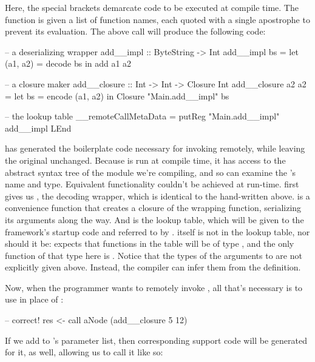 \documentclass[preprint]{sigplanconf}
\begin{document}
Here, the special brackets \textt{\$( )} demarcate code to be executed at compile time. The  function is given a list of function names, each quoted with a single apostrophe to prevent its evaluation. The above  call will produce the following code:

\begin{code}
-- a deserializing wrapper
add__impl :: ByteString -> Int
add__impl bs =
  let (a1, a2) = decode bs
   in add a1 a2

-- a closure maker
add__closure :: Int -> Int -> Closure Int
add__closure a2 a2 = 
  let bs = encode (a1, a2)
   in Closure "Main.add__impl" bs

-- the lookup table
__remoteCallMetaData = 
  putReg "Main.add__impl" add__impl LEnd
\end{code}

 has generated the boilerplate code necessary for invoking  remotely, while leaving the original  unchanged. Because  is run at compile time, it has access to the abstract syntax tree of the module we're compiling, and so can examine the 's name and type. Equivalent functionality couldn't be achieved at run-time.  first gives us , the decoding wrapper, which is identical to the hand-written  above.  is a convenience function that creates a closure of the wrapping function, serializing its arguments along the way. And  is the lookup table, which will be given to the framework's startup code and referred to by .  itself is not in the lookup table, nor should it be:  expects that functions in the table will be of type , and the only function of that type here is . Notice that the types of the arguments to  are not explicitly given above. Instead, the compiler can infer them from the definition.

Now, when the programmer wants to remotely invoke , all that's necessary is to use  in place of :

\begin{code}
-- correct!
res <- call aNode (add__closure 5 12)
\end{code}

If we add  to 's parameter list, then corresponding support code will be generated for it, as well, allowing us to call it like so:
\end{document}
